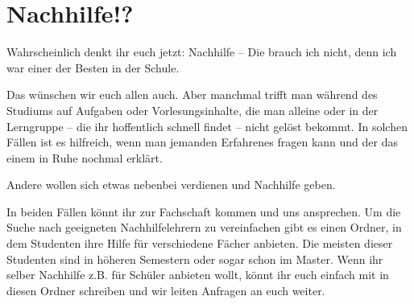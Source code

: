 \section{Nachhilfe!?}

\begin{multicols}{2}

Wahrscheinlich denkt ihr euch jetzt: Nachhilfe -- Die brauch ich nicht, denn ich war einer der Besten in der Schule.

Das wünschen wir euch allen auch. Aber manchmal trifft man während des Studiums auf Aufgaben oder Vorlesungsinhalte, die man alleine oder in der Lerngruppe -- die ihr hoffentlich schnell findet -- nicht gelöst bekommt. In solchen Fällen ist es hilfreich, wenn man jemanden Erfahrenes fragen kann und der das einem in Ruhe nochmal erklärt.

Andere wollen sich etwas nebenbei verdienen und Nachhilfe geben.

In beiden Fällen könnt ihr zur Fachschaft kommen und uns ansprechen. Um die Suche nach geeigneten Nachhilfelehrern zu vereinfachen gibt es einen Ordner, in dem Studenten ihre Hilfe für verschiedene Fächer anbieten. Die meisten dieser Studenten sind in höheren Semestern oder sogar schon im Master. Wenn ihr selber Nachhilfe z.B. für Schüler anbieten wollt, könnt ihr euch einfach mit in diesen Ordner schreiben und wir leiten Anfragen an euch weiter. 

\end{multicols}

